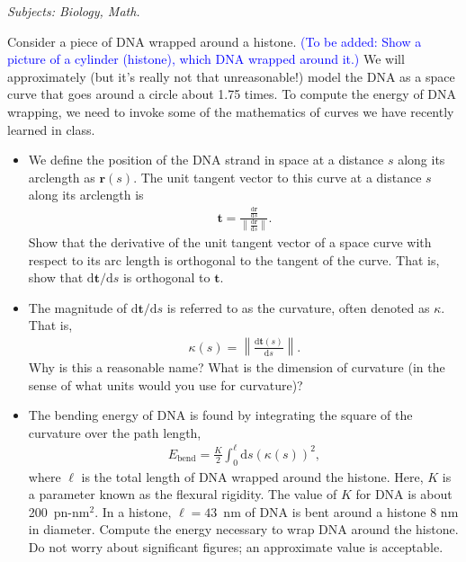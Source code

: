 \documentclass{integrated_core_problems}
\begin{document}
\begin{problem}
  \label{prob:space_curves_and_dna}

\noindent \textit{Subjects: Biology, Math.}

\noindent Consider a piece of DNA wrapped around a histone. \textcolor{blue}{(To be added: Show a picture of a cylinder (histone), which DNA wrapped around it.)} We will approximately (but it's really not that unreasonable!) model the DNA as a space curve that goes around a circle about 1.75 times. To compute the energy of DNA wrapping, we need to invoke some of the mathematics of curves we have recently learned in class.

\begin{itemize}
  \item[a)] We define the position of the DNA strand in space at a distance $s$ along its arclength as $\mathbf{r}(s)$. The unit tangent vector to this curve at a distance $s$ along its arclength is
  \begin{align}
    \mathbf{t} = \frac{\displaystyle{\frac{\mathrm{d}\mathbf{r}}{\mathrm{d}s}}}{\displaystyle{\left\lVert\frac{\mathrm{d}\mathbf{r}}{\mathrm{d}s}\right\rVert}}.
  \end{align}
  Show that the derivative of the unit tangent vector of a space curve with respect to its arc length is orthogonal to the tangent of the curve. That is, show that $\mathrm{d}\mathbf{t}/\mathrm{d}s$ is orthogonal to $\mathbf{t}$.
  \item[b)] The magnitude of $\mathrm{d}\mathbf{t}/\mathrm{d}s$ is referred to as the curvature, often denoted as $\kappa$. That is,
  \begin{align}
    \kappa(s) = \left\lVert\frac{\mathrm{d}\mathbf{t}(s)}{\mathrm{d}s} \right\rVert. 
  \end{align}
  Why is this a reasonable name? What is the dimension of curvature (in the sense of what units would you use for curvature)?
  \item[c)] The bending energy of DNA is found by integrating the square of the curvature over the path length,
  \begin{align}
    E_\mathrm{bend} = \frac{K}{2}\int_0^\ell \mathrm{d}s\left(\kappa(s)\right)^2,
  \end{align}
  where $\ell$ is the total length of DNA wrapped around the histone. Here, $K$ is a parameter known as the flexural rigidity. The value of $K$ for DNA is about 200~pn-nm$^2$. In a histone, $\ell = 43$~nm of DNA is bent around a histone 8 nm in diameter. Compute the energy necessary to wrap DNA around the histone. Do not worry about significant figures; an approximate value is acceptable.
\end{itemize}
\end{problem}
\end{document}
